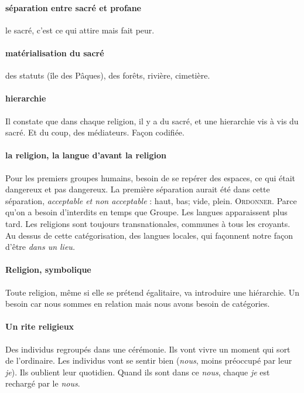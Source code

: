  \paragraph{séparation entre sacré et profane} le sacré, c'est ce qui attire mais fait peur.

 \paragraph{matérialisation du sacré} des statuts (île des Pâques), des forêts, rivière, cimetière. 
 
 \paragraph{hierarchie } Il constate que dans chaque religion, il y a du sacré, et une hierarchie vis à vis du sacré. Et du coup, des médiateurs. Façon codifiée.

 \paragraph{la religion, la langue d'avant la religion} Pour les premiers groupes humains, besoin de se repérer des espaces, ce qui était dangereux et pas dangereux. La première séparation aurait été dans cette séparation, \textit{acceptable et non acceptable} : haut, bas; vide, plein. \textsc{Ordonner}. Parce qu'on a besoin d'interdits en temps que Groupe.
 Les langues apparaissent plus tard. Les religions sont toujours transnationales, communes à tous les croyants. Au dessus de cette catégorisation, des langues locales, qui façonnent notre façon d'être \textit{dans un lieu.}

 \paragraph{Religion, symbolique} Toute religion, même si elle se prétend égalitaire, va introduire une hiérarchie. Un besoin car nous sommes en relation mais nous avons besoin de catégories. 

 \paragraph{Un rite  religieux} Des individus regroupés dans une cérémonie. Ils vont vivre un moment qui sort de l'ordinaire. Les individus vont se sentir bien (\textit{nous}, moins préoccupé par leur \textit{je}). Ils oublient leur quotidien. Quand ils sont dans ce \textit{nous}, chaque \textit{je} est rechargé par le \textit{nous}. 

